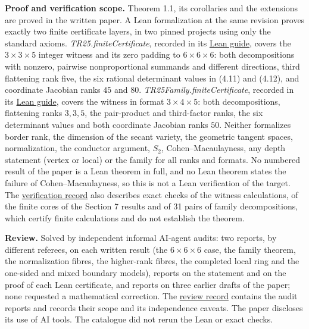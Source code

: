 \documentclass[11pt,a4paper]{article}
\begin{document}
\textbf{Proof and verification scope.} Theorem 1.1, its corollaries and
the extensions are proved in the written paper. A Lean formalization at
the same revision proves exactly two finite certificate layers, in two
pinned projects using only the standard axioms.
\textit{TR25.finiteCertificate}, recorded in its
\href{https://github.com/erenup/segre-secant-cohen-macaulay/blob/3d8b1586b4e6e7ee7164116711aced9f7a23a057/lean/witness-666/README.md}{Lean
guide}, covers the \(3\times3\times5\) integer witness and its zero
padding to \(6\times6\times6\): both decompositions with nonzero,
pairwise nonproportional summands and different directions, third
flattening rank five, the six rational determinant values in (4.11) and
(4.12), and coordinate Jacobian ranks \(45\) and \(80\).
\textit{TR25Family.finiteCertificate}, recorded in its
\href{https://github.com/erenup/segre-secant-cohen-macaulay/blob/3d8b1586b4e6e7ee7164116711aced9f7a23a057/lean/family-345/README.md}{Lean
guide}, covers the witness in format \(3\times4\times5\): both
decompositions, flattening ranks \(3,3,5\), the pair-product and
third-factor ranks, the six determinant values and both coordinate
Jacobian ranks \(50\). Neither formalizes border rank, the dimension of
the secant variety, the geometric tangent spaces, normalization, the
conductor argument, \(S_2\), Cohen--Macaulayness, any depth statement
(vertex or local) or the family for all ranks and formats. No numbered
result of the paper is a Lean theorem in full, and no Lean theorem
states the failure of Cohen--Macaulayness, so this is not a Lean
verification of the target. The
\href{https://github.com/erenup/segre-secant-cohen-macaulay/blob/3d8b1586b4e6e7ee7164116711aced9f7a23a057/VERIFICATION.md}{verification
record} also describes exact checks of the witness calculations, of the
finite cores of the Section 7 results and of 31 pairs of family
decompositions, which certify finite calculations and do not establish
the theorem.

\textbf{Review.} Solved by independent informal AI-agent audits: two
reports, by different referees, on each written result (the
\(6\times6\times6\) case, the family theorem, the normalization fibres,
the higher-rank fibres, the completed local ring and the one-sided and
mixed boundary models), reports on the statement and on the proof of
each Lean certificate, and reports on three earlier drafts of the paper;
none requested a mathematical correction. The
\href{https://github.com/erenup/segre-secant-cohen-macaulay/blob/3d8b1586b4e6e7ee7164116711aced9f7a23a057/verification/reviews/README.md}{review
record} contains the audit reports and records their scope and its
independence caveats. The paper discloses its use of AI tools. The
catalogue did not rerun the Lean or exact checks.
\end{document}
